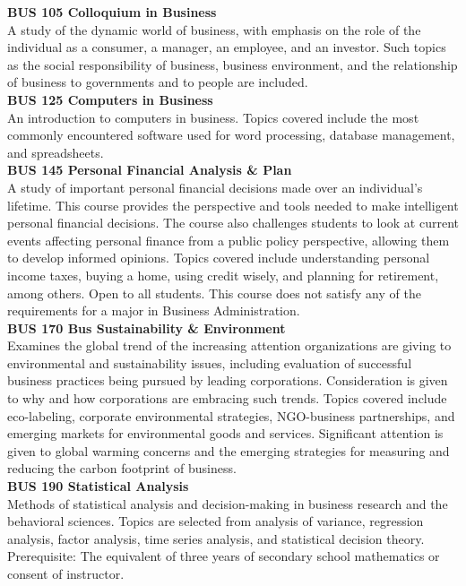 \documentclass[
  letterpaper,
]{scrbook}
\begin{document}
\textbf{BUS 105 Colloquium in Business}\\
A study of the dynamic world of business, with emphasis on the role of
the individual as a consumer, a manager, an employee, and an investor.
Such topics as the social responsibility of business, business
environment, and the relationship of business to governments and to
people are included.\\
\textbf{BUS 125 Computers in Business}\\
An introduction to computers in business. Topics covered include the
most commonly encountered software used for word processing, database
management, and spreadsheets.\\
\textbf{BUS 145 Personal Financial Analysis \& Plan}\\
A study of important personal financial decisions made over an
individual's lifetime. This course provides the perspective and tools
needed to make intelligent personal financial decisions. The course also
challenges students to look at current events affecting personal finance
from a public policy perspective, allowing them to develop informed
opinions. Topics covered include understanding personal income taxes,
buying a home, using credit wisely, and planning for retirement, among
others. Open to all students. This course does not satisfy any of the
requirements for a major in Business Administration.\\
\textbf{BUS 170 Bus Sustainability \& Environment}\\
Examines the global trend of the increasing attention organizations are
giving to environmental and sustainability issues, including evaluation
of successful business practices being pursued by leading corporations.
Consideration is given to why and how corporations are embracing such
trends. Topics covered include eco-labeling, corporate environmental
strategies, NGO-business partnerships, and emerging markets for
environmental goods and services. Significant attention is given to
global warming concerns and the emerging strategies for measuring and
reducing the carbon footprint of business.\\
\textbf{BUS 190 Statistical Analysis}\\
Methods of statistical analysis and decision-making in business research
and the behavioral sciences. Topics are selected from analysis of
variance, regression analysis, factor analysis, time series analysis,
and statistical decision theory. Prerequisite: The equivalent of three
years of secondary school mathematics or consent of instructor.\\
\end{document}
